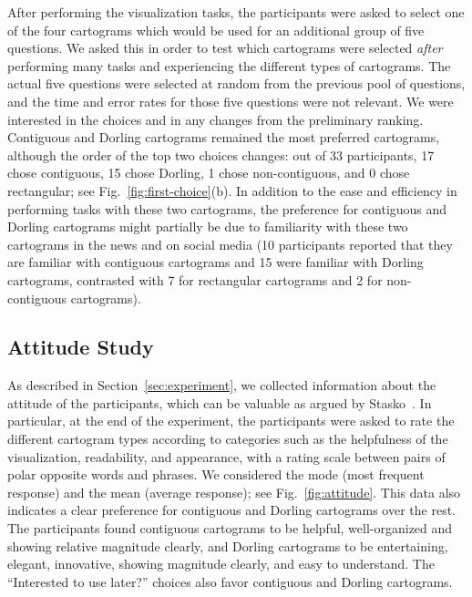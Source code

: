 \documentclass[10pt,journal,compsoc]{IEEEtran}
\begin{document}



After performing the visualization tasks, the participants were asked to select one of the four cartograms which would be used for an additional group of five questions. We asked this in order to test which cartograms were selected {\em after} performing many tasks and experiencing the different types of cartograms. The actual five questions were selected at random from the previous pool of questions, and the time and error rates for those five questions were not relevant. We were interested in the choices and in any changes from the preliminary ranking. Contiguous and Dorling cartograms remained the most preferred cartograms, although the order of the top two choices changes: out of 33 participants, 17 chose contiguous, 15 chose Dorling, 1 chose non-contiguous, and 0 chose rectangular; see Fig.~\ref{fig:first-choice}(b).  
In addition to the ease and efficiency in performing tasks with these two cartograms, the
 preference for contiguous and Dorling cartograms might partially be due to familiarity
 with these two cartograms in the news and on social media (10 participants reported that they are familiar with contiguous cartograms and 15 were familiar with
 Dorling cartograms, contrasted with 7 for rectangular cartograms and 2 for non-contiguous cartograms).




\subsection{Attitude Study}
As described in Section~\ref{sec:experiment}, we collected information about the attitude of the participants, which can be valuable as argued by Stasko~\cite{Stasko06}. In particular, at the end of the experiment, the participants were asked to rate the different cartogram types according to categories such as the helpfulness of the visualization, readability, and appearance, with a 
 rating scale between pairs of polar opposite words and phrases.
We considered the mode (most frequent response) and the mean (average response); see Fig.~\ref{fig:attitude}. This data also indicates a clear preference for contiguous and Dorling cartograms over the rest. The participants found contiguous cartograms to be helpful, well-organized and showing relative magnitude clearly, and Dorling cartograms to be entertaining, elegant, innovative, showing magnitude clearly, and easy to understand. The ``Interested to use later?'' choices also favor contiguous and Dorling cartograms. 
\end{document}
